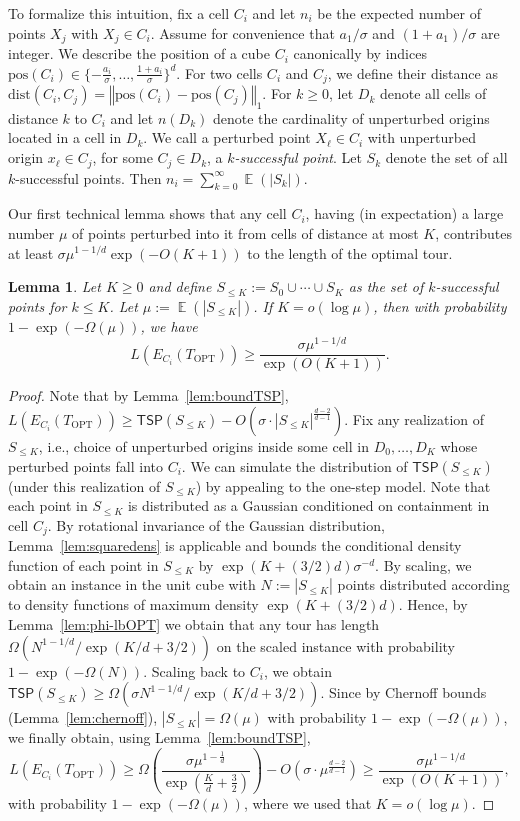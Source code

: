 \documentclass[11pt,DIV=12,a4paper]{scrartcl}
\newtheorem{lemma}[claim]{Lemma}
\DeclareMathOperator{\expected}{\mathbb{E}}
\newcommand{\pos}{\mathrm{pos}}
\newcommand{\distance}{\mathrm{dist}}
\newcommand{\lemref}[1]{Lemma~\ref{lem:#1}}
\newcommand{\norm}[1]{\left\Vert #1 \right\Vert}
\newcommand{\TSP}{\mathsf{TSP}}
\newcommand{\OPT}{\mathrm{OPT}}
\begin{document}
To formalize this intuition, fix a cell $C_i$ and let $n_i$ be the expected number of points $X_j$ with $X_j\in C_i$. Assume for convenience that $a_1/\sigma$ and $(1+a_1)/\sigma$ are integer. We describe the position of a cube $C_i$ canonically by indices $\pos(C_i) \in \{-\frac{a_i}{\sigma},\dots, \frac{1+a_i}{\sigma}\}^d$. For two cells $C_i$ and $C_j$, we define their distance as $\distance(C_i,C_j) = \norm{\pos(C_i)-\pos(C_j)}_1$.
For $k\ge 0$, let $D_k$ denote all cells of distance $k$ to $C_i$ and let $n(D_k)$ denote the cardinality of unperturbed origins located in a cell in $D_k$. We call a perturbed point $X_\ell\in C_i$ with unperturbed origin $x_\ell\in C_j$, for some $C_j \in D_k$, a \emph{$k$-successful point}. Let $S_k$ denote the set of all $k$-successful points. Then $n_i = \sum_{k=0}^\infty \expected(|S_k|)$. 

Our first technical lemma shows that any cell $C_i$, having (in expectation) a large number $\mu$ of points perturbed into it from cells of distance at most $K$, contributes at least $\sigma \mu^{1-1/d} \exp(-O(K+1))$ to the length of the optimal tour. 

\begin{lemma}\label{lem:lb-k-successful}
Let $K\ge 0$ and define $S_{\le K}:= S_0\cup \cdots \cup S_{K}$ as the set of $k$-successful points for $k\le K$. Let $\mu := \expected(|S_{\le K}|)$. If $K=o(\log \mu)$, then with probability $1-\exp(-\Omega(\mu))$, we have
\[ L(E_{C_i}(T_\OPT)) \ge \frac{\sigma \mu^{1-1/d}}{\exp(O(K+1))}. \]
\end{lemma}
\begin{proof}%
Note that by Lemma~\ref{lem:boundTSP}, $L(E_{C_i}(T_\OPT)) \ge \TSP(S_{\le K})-O(\sigma \cdot {|S_{\le K}|}^{\frac{d-2}{d-1}})$. Fix any realization of $S_{\le K}$, i.e., choice of unperturbed origins inside some cell in $D_0,\dots,D_K$ whose perturbed points fall into $C_i$. We can simulate the distribution of $\TSP(S_{\le K})$ (under this realization of $S_{\le K}$) by appealing to the one-step model.  Note that each point in $S_{\le K}$ is distributed as a Gaussian conditioned on containment in cell $C_j$. By rotational invariance of the Gaussian distribution, Lemma~\ref{lem:squaredens} is applicable and bounds the conditional density function of each point in $S_{\le K}$ by $\exp(K + (3/2)d)\sigma^{-d}$. By scaling, we obtain an instance in the unit cube with $N:=|S_{\le K}|$ points distributed according to density functions of maximum density $\exp(K+(3/2)d)$. Hence, by Lemma~\ref{lem:phi-lbOPT} we obtain that any tour has length $\Omega(N^{1-1/d}/\exp(K/d+3/2))$ on the scaled instance with probability $1-\exp(-\Omega(N))$. Scaling back to $C_i$, we obtain $\TSP(S_{\le K})\ge \Omega(\sigma N^{1-1/d}/\exp(K/d+3/2))$. Since by Chernoff bounds (Lemma~\ref{lem:chernoff}), $|S_{\le K}| = \Omega(\mu)$ with probability $1-\exp(-\Omega(\mu))$, we finally obtain, using \lemref{boundTSP},
\[L(E_{C_i}(T_\OPT)) \ge \Omega\left(\frac{\sigma \mu^{1-\frac{1}{d}}}{\exp(\frac{K}{d}+\frac{3}{2})}\right) - O(\sigma \cdot {\mu}^{\frac{d-2}{d-1}}) \ge \frac{\sigma \mu^{1-1/d}}{\exp(O(K+1))}, \]
with probability $1-\exp(-\Omega(\mu))$, where we used that $K=o(\log \mu)$.
\end{proof}
\end{document}
